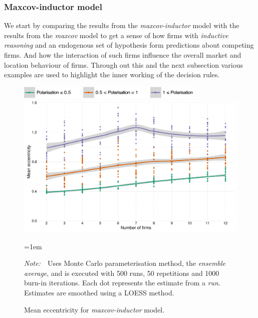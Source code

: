 \documentclass[preprint, 12pt]{elsarticle}
\newcommand{\Figtext}[1]{%
	\begin{tablenotes}[para,flushleft]
		\hangindent=1em
		\footnotesize
		\raggedright
		#1
	\end{tablenotes}
}
\newcommand{\Fignote}[1]{\Figtext{\emph{Note:~}~#1}}
\begin{document}
\subsubsection{Maxcov-inductor model}

We start by comparing the results from the \emph{maxcov-inductor} model with the results from the \emph{maxcov} model to get a sense of how firms with \emph{inductive reasoning} and an endogenous set of hypothesis form predictions about competing firms. And how the interaction of such firms influence the overall market and location behaviour of firms. Through out this and the next subsection various examples are used to highlight the inner working of the decision rules.

\begin{figure}[ht!]
	\centering
	\includegraphics[width=90mm]{Graphics/legend_pol.pdf}
	\includegraphics[width=\textwidth]{Graphics/fig611a.pdf}
	\caption{Mean eccentricity for \emph{maxcov-inductor} model.}
	\label{fig:eccentricity_mi}
	\Fignote{Uses Monte Carlo parameterisation method, the \emph{ensemble average}, and is executed with 500 runs, 50 repetitions and 1000 burn-in iterations. Each dot represents the estimate from a \emph{run}. Estimates are smoothed using a LOESS method.}
\end{figure}
\end{document}
